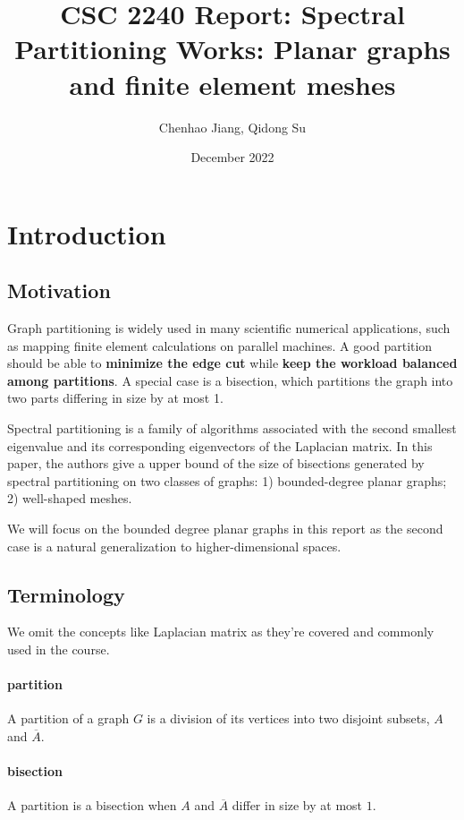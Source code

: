 \documentclass[11pt]{article}
\title{CSC 2240 Report: Spectral Partitioning Works: Planar graphs and finite element meshes}
\author{Chenhao Jiang, Qidong Su}
\date{December 2022}
\begin{document}
\maketitle

\section{Introduction}

\subsection{Motivation}

Graph partitioning is widely used in many scientific numerical applications, such as mapping finite element calculations on parallel machines. A good partition should be able to \textbf{minimize the edge cut} while \textbf{keep the workload balanced among partitions}. A special case is a bisection, which partitions the graph into two parts differing in size by at most 1.

Spectral partitioning is a family of algorithms associated with the second smallest eigenvalue and its corresponding eigenvectors of the Laplacian matrix. In this paper, the authors give a upper bound of the size of bisections generated by spectral partitioning on two classes of graphs: 1) bounded-degree planar graphs; 2) well-shaped meshes.

We will focus on the bounded degree planar graphs in this report as the second case is a natural generalization to higher-dimensional spaces.

\subsection{Terminology}
We omit the concepts like Laplacian matrix as they're covered and commonly used in the course.

\paragraph{partition} A partition of a graph $G$ is a division of its vertices into two disjoint subsets, $A$ and $\overline{A}$.

\paragraph{bisection} A partition is a bisection when $A$ and $\overline{A}$ differ in size by at most $1$.
\end{document}
